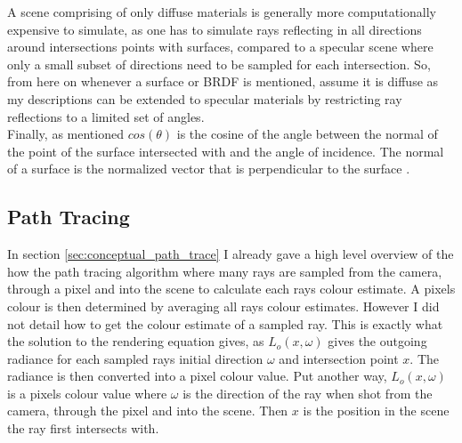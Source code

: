 \documentclass[ %
                    author={Callum Pearce},
                supervisor={Dr. Neill Campbell},
                    degree={MEng},
                     title={How effective are Temporal difference learning methods for reducing the number of zero contribution light paths while still accurately approximating Global Illumination in Path tracing?},
                  subtitle={},
                      type={research},
                      year={2019} ]{dissertation}
\begin{document}
A scene comprising of only diffuse materials is generally more computationally expensive to simulate, as one has to simulate rays reflecting in all directions around intersections points with surfaces, compared to a specular scene where only a small subset of directions need to be sampled for each intersection. So, from here on whenever a surface or BRDF is mentioned, assume it is diffuse as my descriptions can be extended to specular materials by restricting ray reflections to a limited set of angles.\\

Finally, as mentioned $cos(\theta)$ is the cosine of the angle between the normal of the point of the surface intersected with and the angle of incidence. The normal of a surface is the normalized vector that is perpendicular to the surface \cite{normals}. 

\subsection{Path Tracing}

In section \ref{sec:conceptual_path_trace} I already gave a high level overview of the how the path tracing algorithm where many rays are sampled from the camera, through a pixel and into the scene to calculate each rays colour estimate. A pixels colour is then determined by averaging all rays colour estimates. However I did not detail how to get the colour estimate of a sampled ray. This is exactly what the solution to the rendering equation gives, as $L_o(x,\omega)$ gives the outgoing radiance for each sampled rays initial direction $\omega$ and intersection point $x$. The radiance is then converted into a pixel colour value. Put another way, $L_o(x,\omega)$ is a pixels colour value where $\omega$ is the direction of the ray when shot from the camera, through the pixel and into the scene. Then $x$ is the position in the scene the ray first intersects with. \\

\end{document}
